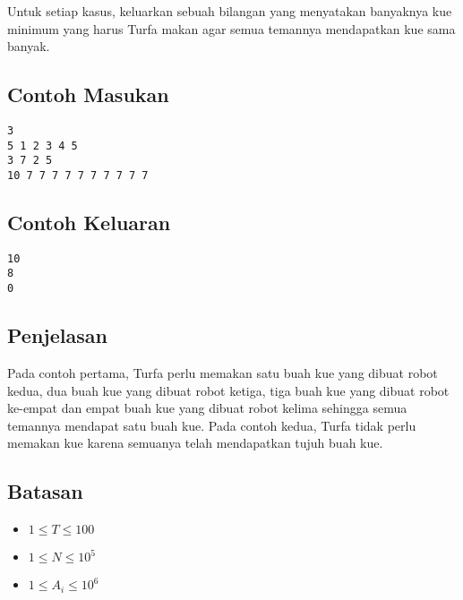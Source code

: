 \documentclass{article}
\begin{document}
\par Untuk setiap kasus, keluarkan sebuah bilangan yang menyatakan banyaknya kue minimum yang harus Turfa makan agar semua temannya mendapatkan kue sama banyak.

\subsection*{Contoh Masukan}

\begin{lstlisting}
3
5 1 2 3 4 5
3 7 2 5
10 7 7 7 7 7 7 7 7 7 7
\end{lstlisting}

\subsection*{Contoh Keluaran}

\begin{lstlisting}
10
8
0
\end{lstlisting}

\subsection*{Penjelasan}

Pada contoh pertama, Turfa perlu memakan satu buah kue yang dibuat robot kedua, dua buah kue yang dibuat robot ketiga, tiga buah kue yang dibuat robot ke-empat dan empat buah kue yang dibuat robot kelima sehingga semua temannya mendapat satu buah kue.
Pada contoh kedua, Turfa tidak perlu memakan kue karena semuanya telah mendapatkan tujuh buah kue.

\subsection*{Batasan}

\begin{itemize}
	\item $1 \leq T \leq 100$
	\item $1 \leq N \leq 10^5$
	\item $1 \leq A_i \leq 10^6$
\end{itemize}
\end{document}
